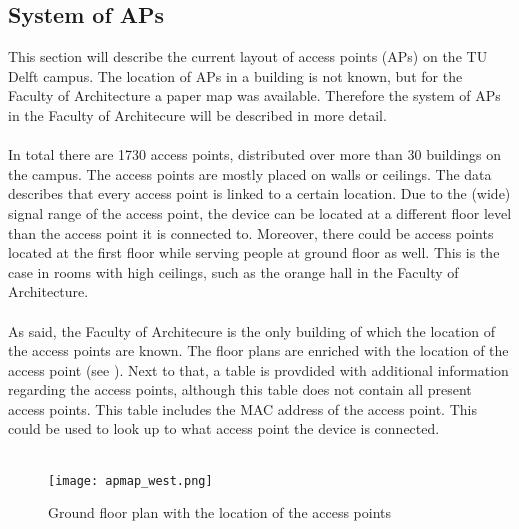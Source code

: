 \subsection{System of APs}\label{systemofaps}
This section will describe the current layout of access points (APs) on the TU Delft campus. The location of APs in a building is not known, but for the Faculty of Architecture a paper map was available. Therefore the system of APs in the Faculty of Architecure will be described in more detail. \\\\
In total there are 1730 access points, distributed over more than 30 buildings on the campus. The access points are mostly placed on walls or ceilings. The data describes that every access point is linked to a certain location. Due to the (wide) signal range of the access point, the device can be located at a different floor level than the access point it is connected to. Moreover, there could be access points located at the first floor while serving people at ground floor as well. This is the case in rooms with high ceilings, such as the orange hall in the Faculty of Architecture. \\\\
As said, the Faculty of Architecure is the only building of which the location of the access points are known. The floor plans are enriched with the location of the access point (see ). Next to that, a table is provdided with additional information regarding the access points, although this table does not contain all present access points. This table includes the MAC address of the access point. This could be used to look up to what access point the device is connected.\\\\
\begin{figure}[H]
	\centering
	\texttt{[image: apmap\_west.png]}
	\captionsetup{justification=centering}
	\caption{Ground floor plan with the location of the access points}
	\label{apmap_west}
\end{figure}

